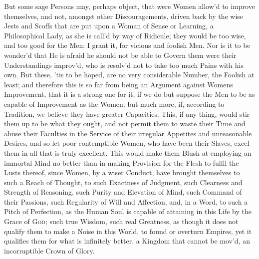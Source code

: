 But some sage Persons may, perhaps object, that were Women allow'd to
improve themselves, and not, amongst other Discouragements, driven
back by the  wise Jests and Scoffs that are put upon a Woman
of Sense or Learning, a Philosophical Lady, as she is call'd by way of
Ridicule; they would be too wise, and too good for the Men: I grant
it, for vicious and foolish Men. Nor is it to be wonder'd that He is
afraid he should not be able to Govern them were their Understandings
improv'd, who is resolv'd not to take too much Pains with his own. But
these, 'tis to be hoped, are no very considerable Number, the Foolish
at least; and therefore this is so far from being an Argument against
Womens Improvement, that it is a strong one for it, if we do but
suppose the Men to be as capable of Improvement as the Women; but much
more, if, according to Tradition, we believe they have greater
Capacities. This, if any thing, would stir them up to be what they
ought, and not permit them to waste their Time and abuse their
Faculties in the Service of their irregular Appetites and unreasonable
Desires, and so let poor contemptible Women, who have  been
their Slaves, excel them in all that is truly excellent. This would
make them Blush at employing an immortal Mind no better than in making
Provision for the Flesh to fulfil the Lusts thereof, since Women, by a
wiser Conduct, have brought themselves to such a Reach of Thought, to
such Exactness of Judgment, such Clearness and Strength of Reasoning,
such Purity and Elevation of Mind, such Command of their Passions,
such Regularity of Will and Affection, and, in a Word, to such a Pitch
of Perfection, as the Human Soul is capable of attaining in this Life
by the Grace of \textsc{God}; such true Wisdom, such real Greatness,
as though it does not qualify them to make a Noise in this World, to
found or overturn Empires, yet it qualifies them for what is
infinitely better, a Kingdom that cannot be mov'd, an incorruptible
Crown of Glory.

